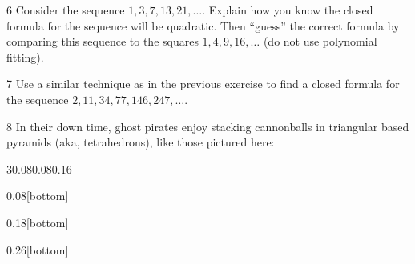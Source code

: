 \documentclass[11pt,]{book}
\theoremstyle{ptxplainnotitle}
\theoremstyle{ptxplaintitle}
\theoremstyle{ptxdefinitionnotitle}
\theoremstyle{ptxdefinitiontitle}
\theoremstyle{ptxdefinitionnotitle}
\theoremstyle{ptxdefinitiontitle}
\theoremstyle{ptxdefinitionnotitle}
\theoremstyle{ptxdefinitiontitle}
\theoremstyle{ptxdefinitiontitlenonumber}
\theoremstyle{ptxdefinitiontitlenonumber}
\numberwithin{equation}{chapter}
\begin{document}
\begin{divisionexercise}{6}\hypertarget{exercise-34}{}
\hypertarget{p-409}{}%
Consider the sequence \(1, 3, 7, 13, 21, \ldots\). Explain how you know the closed formula for the sequence will be quadratic. Then ``guess'' the correct formula by comparing this sequence to the squares \(1, 4, 9, 16, \ldots\) (do not use polynomial fitting).%
\end{divisionexercise}%
\begin{divisionexercise}{7}\hypertarget{exercise-35}{}
\hypertarget{p-412}{}%
Use a similar technique as in the previous exercise to find a closed formula for the sequence \(2, 11, 34, 77, 146, 247,\ldots\).%
\end{divisionexercise}%
\begin{divisionexercise}{8}\hypertarget{exercise-36}{}
\hypertarget{p-413}{}%
In their down time, ghost pirates enjoy stacking cannonballs in triangular based pyramids (aka, tetrahedrons), like those pictured here:%
\begin{sidebyside}{3}{0.08}{0.08}{0.16}
\begin{sbspanel}{0.08}[bottom]
\end{sbspanel}
\begin{sbspanel}{0.18}[bottom]
\end{sbspanel}
\begin{sbspanel}{0.26}[bottom]
\end{sbspanel}

\end{sidebyside}
\end{divisionexercise}
\end{document}
